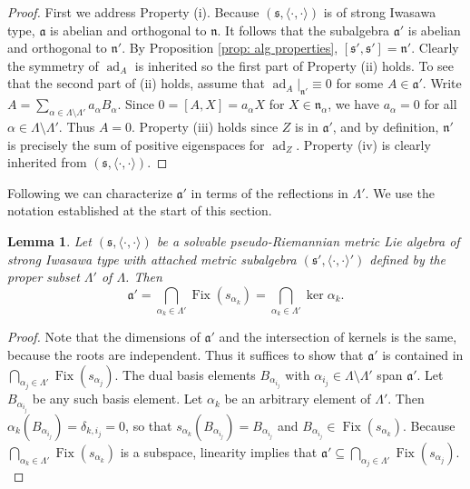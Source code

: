 \documentclass[12pt]{amsart}
\newcommand\Fix{\operatorname{Fix}}
\newcommand{\fraka}{\ensuremath{\mathfrak{a}} }
\newcommand{\frakn}{\ensuremath{\mathfrak{n}} }
\newcommand{\fraks}{\ensuremath{\mathfrak{s}} }
\renewcommand\a{{\mathfrak{a}}}
\newcommand\n{{\mathfrak{n}}}
\newcommand\s{{\mathfrak{s}}}
\newcommand\ip{{\langle\cdot {,} \cdot\rangle}}
\newcommand\ad{\operatorname{ad}}
\theoremstyle{plain}
\newtheorem{lemma}[theorem]{Lemma}
\theoremstyle{definition}
\theoremstyle{remark}
\numberwithin{equation}{section}
\numberwithin{theorem}{section}
\begin{document}
\begin{proof} 
First  we address Property (i).
 Because $(\s, \ip)$ is of strong Iwasawa type, $\fraka$ is abelian
and orthogonal to $\frakn$. It follows that the subalgebra $\fraka'$
is abelian and orthogonal to $\frakn'$. By Proposition \ref{prop: alg properties},
$[\s',\s']= \n'$.  
 Clearly the symmetry of  $\ad_A$  is inherited so the first part of 
 Property (ii) holds. To see  that the second part of (ii) holds, assume that
 $\ad_{A}|_{\frakn'} \equiv 0$ for some $A \in \fraka'$.  
Write $A = \sum_{\alpha \in \Lambda \setminus \Lambda'} a_\alpha B_{\alpha} $. Since $0 = [A, X] =a_{\alpha}X$ for $X \in \frakn_{\alpha}$, we have  $a_\alpha =0$ for all $\alpha \in \Lambda \setminus \Lambda'$. Thus $A=0$.
Property (iii)  holds since  $Z$ is in $\a'$, and by definition,  $\frakn'$  is precisely the sum of positive eigenspaces for $\ad_Z$.
Property   (iv) is  clearly inherited from  $(\s, \ip)$. 
\end{proof}

Following \cite{tamaru-11} we can characterize $\fraka'$ in terms of the reflections in $\Lambda'.$ 
We use the notation established at the start of this section. 

\begin{lemma}\cite[Lemma 3.8]{tamaru-11}\label{lem: root perp}  Let $(\fraks, \ip)$ be a solvable pseudo-Riemannian  metric Lie algebra of strong  Iwasawa type with attached metric subalgebra $(\fraks', \ip')$ defined by the proper subset $\Lambda'$ of $\Lambda$.
Then
$$\a' = \bigcap_{\alpha_k \in \Lambda'} \Fix(s_{\alpha_k}) = \bigcap_{\alpha_k \in \Lambda'} \ker \alpha_k .$$
\end{lemma}
\begin{proof}  
Note that the dimensions of $\fraka'$ and the intersection of kernels is the same, because the roots are independent.  Thus it suffices to show that $\a'$ is contained in $\bigcap_{\alpha_j \in \Lambda'} \Fix(s_{\alpha_j})$.  
The dual basis elements $B_{\alpha_{i_j}}$ with $\alpha_{i_j} \in \Lambda \setminus \Lambda'$ span $\a'$.  
Let  $B_{\alpha_{i_j}}$  be any such basis element. 
Let  $\alpha_k$ be an arbitrary element of $\Lambda'$.   Then   $\alpha_k (B_{\alpha_{i_j}})=\delta_{k,{i_j}} =0$, so that $s_{\alpha_k} (B_{\alpha_{i_j}})=B_{\alpha_{i_j}}$ and $B_{\alpha_{i_j}} \in \Fix(s_{\alpha_k})$. 
Because   $\bigcap_{\alpha_k \in \Lambda'} \Fix(s_{\alpha_k})$ is a subspace, linearity implies that $\a'  \subseteq \bigcap_{\alpha_j \in \Lambda'} \Fix(s_{\alpha_j}).$
\end{proof}
\end{document}
